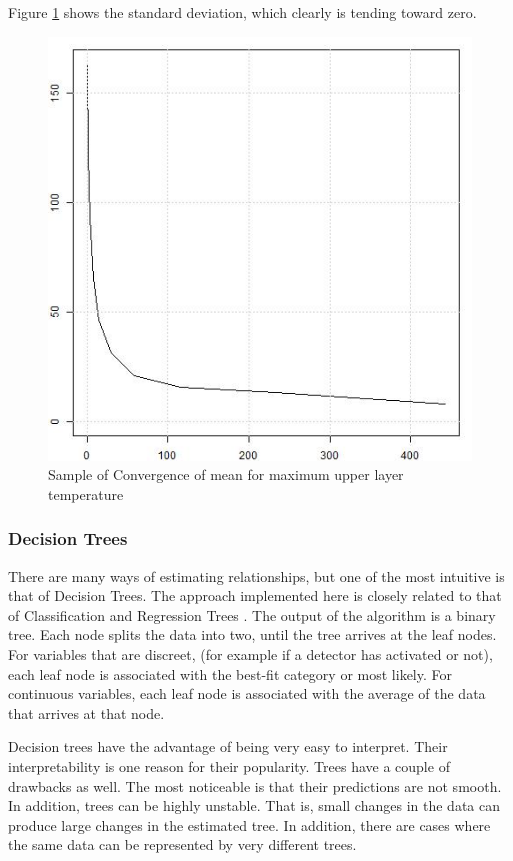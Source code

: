 \documentclass[12pt,twoside]{book}
\begin{document}
Figure \ref{simple_max_temp_sd} shows the standard deviation, which clearly is tending toward zero.

\begin{figure}[h!]
\centering
\includegraphics[width=4.5in]{FIGURES/simple_max_temp_sd.jpeg}
\caption{Sample of Convergence of mean for maximum upper layer temperature}
\label{simple_max_temp_sd}
\end{figure}

\subsubsection{Decision Trees}

There are many ways of estimating relationships, but one of the most intuitive is that of Decision Trees. The approach implemented here is closely related to that of Classification and Regression Trees \cite{Haste_2009}. The output of the algorithm is a binary tree. Each node splits the data into two, until the tree arrives at the leaf nodes. For variables that are discreet, (for example if a detector has activated or not), each leaf node is associated with the best-fit category or most likely. For continuous variables, each leaf node is associated with the average of the data that arrives at that node.

Decision trees have the advantage of being very easy to interpret. Their interpretability is one reason for their popularity. Trees have a couple of drawbacks as well. The most noticeable is that their predictions are not smooth. In addition, trees can be highly unstable. That is, small changes in the data can produce large changes in the estimated tree. In addition, there are cases where the same data can be represented by very different trees.
\end{document}
